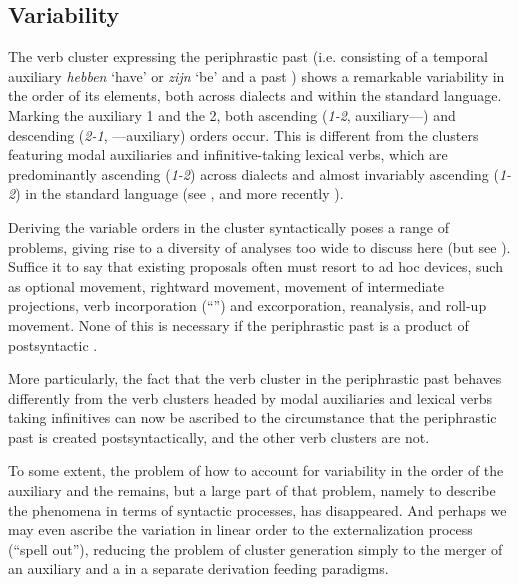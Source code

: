 \documentclass[output=paper]{LSP/langsci}
\begin{document}
\subsection{Variability}
The verb cluster expressing the periphrastic past (i.e. consisting of a temporal auxiliary \textit{hebben} ‘have’ or \textit{zijn} ‘be’ and a past ) shows a remarkable variability in the order of its elements, both across dialects and within the standard language. Marking the auxiliary 1 and the  2, both ascending (\textit{1-2}, auxiliary—) and descending (\textit{2-1}, —auxiliary) orders occur. This is different from the clusters featuring modal auxiliaries and infinitive-taking lexical verbs, which are predominantly ascending (\textit{1-2}) across dialects and almost invariably ascending (\textit{1-2}) in the standard language (see \citealt{Stroop1970,Zwart1996}, and more recently \citealt[14--25]{BarbiersEtAl2008}).

Deriving the variable orders in the cluster syntactically poses a range of problems, giving rise to a diversity of analyses too wide to discuss here (but see \citealt{Wurmbrand2005}). Suffice it to say that existing proposals often must resort to ad hoc devices, such as optional movement, rightward movement, movement of intermediate projections, verb incorporation (``'') and excorporation, reanalysis, and roll-up movement. None of this is necessary if the periphrastic past is a product of postsyntactic .

More particularly, the fact that the verb cluster in the periphrastic past behaves differently from the verb clusters headed by modal auxiliaries and lexical verbs taking infinitives can now be ascribed to the circumstance that the periphrastic past is created postsyntactically, and the other verb clusters are not.

To some extent, the problem of how to account for variability in the order of the auxiliary and the  remains, but a large part of that problem, namely to describe the phenomena in terms of syntactic processes, has disappeared. And perhaps we may even ascribe the variation in linear order to the externalization process (``spell out''), reducing the problem of cluster generation simply to the merger of an auxiliary and a  in a separate derivation feeding  paradigms.
\end{document}
